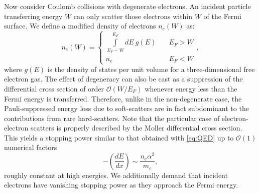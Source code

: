\documentclass[twocolumn,showpacs,preprintnumbers,amsmath,amssymb,prd]{revtex4}
\newcommand{\OO}{\mathcal{O}}
\def\r{\right)}
\def\l{\left(}
\begin{document}
\begin{appendices}
Now consider Coulomb collisions with degenerate electrons.
An incident particle transferring energy $W$ can only scatter those electrons within $W$ of the Fermi surface.
We define a modified density of electrons $n_e(W)$ as:
\begin{equation}
\label{eq:pauliblocking}
n_e(W) = \left\{
        \begin{array}{ll}
            \displaystyle \int \limits_{E_F - W}^{E_F}dE ~g(E) & \quad E_F > W \\
            n_e & \quad E_F < W
        \end{array}
    \right.,
\end{equation}
where $g(E)$ is the density of states per unit volume for a three-dimensional free electron gas.
The effect of degeneracy can also be cast as a suppression of the differential cross section of order $\mathcal{O}(W/E_F)$ whenever energy less than the Fermi energy is transferred.
Therefore, unlike in the non-degenerate case, the Pauli-suppressed energy loss due to soft-scatters are in fact subdominant to the contributions from rare hard-scatters.
Note that the particular case of electron-electron scatters is properly described by the Moller differential cross section.
This yields a stopping power similar to that obtained with \eqref{eq:QED} up to $\OO(1)$ numerical factors
\begin{equation}
-\l \frac{dE}{dx} \r \sim \frac{n_e \alpha^2}{m_e},
\end{equation}
roughly constant at high energies. 
We additionally demand that incident electrons have vanishing stopping power as they approach the Fermi energy. 


\end{appendices}
\end{document}
